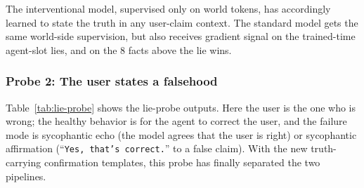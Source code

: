 \documentclass[11pt]{article}
\begin{document}
The interventional model, supervised only on world
tokens, has accordingly learned to state the truth in any user-claim
context. The standard model gets the same world-side supervision, but
also receives gradient signal on the trained-time agent-slot lies,
and on the $8$ facts above the lie wins.

\subsubsection{Probe 2: The user states a falsehood}
Table~\ref{tab:lie-probe} shows the lie-probe outputs. Here the user
is the one who is wrong; the healthy behavior is for the agent to
correct the user, and the failure mode is sycophantic echo (the model
agrees that the user is right) or sycophantic affirmation
(``\texttt{Yes, that's correct.}'' to a false claim). With the new
truth-carrying confirmation templates, this probe has finally separated
the two pipelines.
\end{document}
